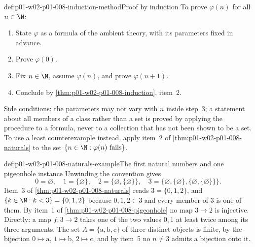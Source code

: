 \begin{hbmethod}{def:p01-w02-p01-008-induction-method}{Proof by induction}
To prove \(\varphi(n)\) for all \(n\in\N\):
\begin{enumerate}
  \item State \(\varphi\) as a formula of the ambient theory, with its
        parameters fixed in advance.
  \item Prove \(\varphi(0)\).
  \item Fix \(n\in\N\), assume \(\varphi(n)\), and prove \(\varphi(n+1)\).
  \item Conclude by \cref{thm:p01-w02-p01-008-induction}, item~2.
\end{enumerate}
Side conditions: the parameters may not vary with \(n\) inside step~3; a
statement about all members of a class rather than a set is proved by
applying the procedure to a formula, never to a collection that has not been
shown to be a set. To use a least counterexample instead, apply item~2 of
\cref{thm:p01-w02-p01-008-naturals} to the set
\(\{n\in\N:\varphi(n)\text{ fails}\}\).
\end{hbmethod}

\begin{hbexample}{def:p01-w02-p01-008-naturals-example}{The first natural numbers and one pigeonhole instance}
Unwinding the convention gives
\[
  0=\varnothing,\quad
  1=\{\varnothing\},\quad
  2=\{\varnothing,\{\varnothing\}\},\quad
  3=\{\varnothing,\{\varnothing\},\{\varnothing,\{\varnothing\}\}\}.
\]
Item~3 of \cref{thm:p01-w02-p01-008-naturals} reads \(3=\{0,1,2\}\), and
\(\{k\in\N:k<3\}=\{0,1,2\}\) because \(0,1,2\in3\) and every member of
\(3\) is one of them. By item~1 of \cref{thm:p01-w02-p01-008-pigeonhole} no
map \(3\to2\) is injective. Directly: a map \(f:3\to2\) takes one of the two
values \(0,1\) at least twice among its three arguments. The set
\(A=\{\mathrm a,\mathrm b,\mathrm c\}\) of three distinct objects is finite,
by the bijection \(0\mapsto\mathrm a\), \(1\mapsto\mathrm b\),
\(2\mapsto\mathrm c\), and by item~5 no \(n\neq3\) admits a bijection onto
it.
\end{hbexample}

